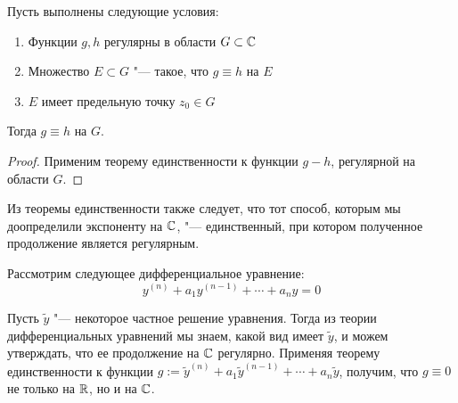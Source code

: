 \begin{corollary}
	Пусть выполнены следующие условия:
	\begin{enumerate}
		\item Функции $g, h$ регулярны в области $G \subset \mathbb{C}$
		\item Множество $E \subset G$ "--- такое, что $g \equiv h$ на $E$
		\item $E$ имеет предельную точку $z_0 \in G$
	\end{enumerate}
	
	Тогда $g \equiv h$ на $G$.
\end{corollary}

\begin{proof}
	Применим теорему единственности к функции $g - h$, регулярной на области $G$.
\end{proof}

\begin{note}
	Из теоремы единственности также следует, что тот способ, которым мы доопределили экспоненту на $\mathbb{C}$, "--- единственный, при котором полученное продолжение является регулярным.
\end{note}

\begin{example}
	Рассмотрим следующее дифференциальное уравнение:
	\[y^{(n)} + a_1y^{(n-1)} + \dotsb + a_ny = 0\]
	
	Пусть $\widetilde y$ "--- некоторое частное решение уравнения. Тогда из теории дифференциальных уравнений мы знаем, какой вид имеет $\widetilde y$, и можем утверждать, что ее продолжение на $\mathbb{C}$ регулярно. Применяя теорему единственности к функции $g := \widetilde y^{(n)} + a_1\widetilde y^{(n-1)} + \dotsb + a_n\widetilde y$, получим, что $g \equiv 0$ не только на $\mathbb{R}$, но и на $\mathbb{C}$.
\end{example}